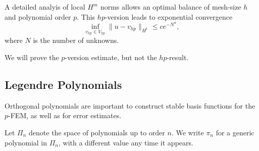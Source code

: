 A detailed analyis of local $H^m$ norms allows an optimal balance of
mesh-size $h$ and polynomial order $p$. This $hp$-version leads to
exponential convergence
$$
\inf_{v_{hp} \in V_{hp}} \| u - v_{hp} \|_{H^1}  \leq c e^{ -N^\alpha },
$$
where $N$ is the number of unknowns. 
 
We will prove the $p$-version estimate, but not the $hp$-result.

\subsection{Legendre Polynomials}
Orthogonal polynomials are important to construct stable basis 
functions for the $p$-FEM, as well as for error estimates.

Let $\Pi_n$ denote the space of polynomials up to order $n$. We write $\pi_n$ for 
a generic polynomial in $\Pi_n$, with a different value any time it appears.

